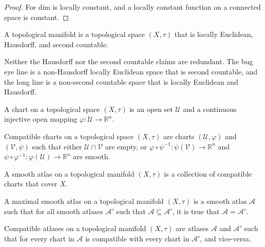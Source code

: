 \documentclass{article}                                                        %
\begin{document}
        \begin{proof}
            For $\textrm{dim}$ is locally constant, and a locally constant
            function on a connected space is constant.
        \end{proof}
        \begin{definition}
            A topological manifold is a topological space $(X,\tau)$
            that is locally Euclidean, Hausdorff, and second countable.
        \end{definition}
        \begin{example}
            Neither the Hausdorff nor the second countable claims are redundant.
            The bug eye line is a non-Hausdorff locally Euclidean space that is
            second countable, and the long line is a non-second countable space
            that is locally Euclidean and Hausdorff.
        \end{example}
        \begin{definition}
            A chart on a topological space $(X,\tau)$ is an open set
            $\mathcal{U}$ and a continuous injective open mapping
            $\varphi:\mathcal{U}\rightarrow\mathbb{R}^{n}$.
        \end{definition}
        \begin{definition}
            Compatible charts on a topological space $(X,\tau)$ are charts
            $(\mathcal{U},\varphi)$ and $(\mathcal{V},\psi)$ such that either
            $\mathcal{U}\cap\mathcal{V}$ are empty, or
            $\varphi\circ\psi^{\minus{1}}:%
             \psi(\mathcal{V})\rightarrow\mathbb{R}^{n}$ and
            $\psi\circ\varphi^{\minus{1}}:%
             \varphi(\mathcal{U})\rightarrow\mathbb{R}^{n}$ are smooth.
        \end{definition}
        \begin{definition}
            A smooth atlas on a topological manifold $(X,\tau)$ is a collection
            of compatible charts that cover $X$.
        \end{definition}
        \begin{definition}
            A maximal smooth atlas on a topological manifold $(X,\tau)$ is a
            smooth atlas $\mathcal{A}$ such that for all smooth atlases
            $\mathcal{A}'$ such that $\mathcal{A}\subseteq\mathcal{A}'$, it is
            true that $\mathcal{A}=\mathcal{A}'$.
        \end{definition}
        \begin{definition}
            Compatible atlases on a topological manifold $(X,\tau)$ are atlases
            $\mathcal{A}$ and $\mathcal{A}'$ such that for every chart in
            $\mathcal{A}$ is compatible with every chart in $\mathcal{A}'$, and
            vice-versa.
        \end{definition}
\end{document}
